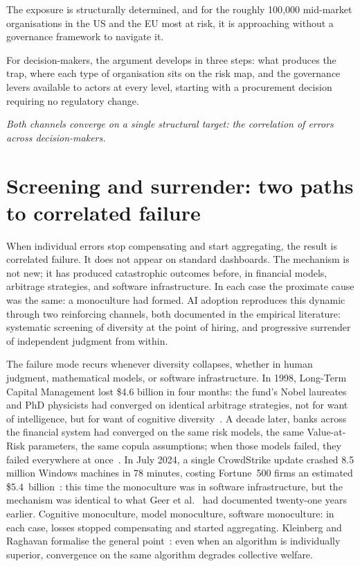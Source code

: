 \documentclass[11pt,a4paper]{article}
\newcommand{\bridgeskip}{\vspace{6pt}}
\begin{document}
The exposure is structurally determined, and for the roughly 100{,}000 mid-market
organisations in the US and the EU most at risk, it is approaching without
a governance framework to navigate it.

For decision-makers, the argument develops in three steps: what produces the trap,
where each type of organisation sits on the risk map, and the governance levers
available to actors at every level, starting with a procurement decision requiring
no regulatory change.

\bridgeskip
\noindent\emph{Both channels converge on a single structural target: the
correlation of errors across decision-makers.}

\section{Screening and surrender: two paths to correlated failure}

When individual errors stop compensating and start aggregating, the result is
correlated failure. It does not appear on standard dashboards. The mechanism is
not new; it has produced catastrophic outcomes before, in financial models,
arbitrage strategies, and software infrastructure. In each case the proximate
cause was the same: a monoculture had formed. AI adoption reproduces this dynamic
through two reinforcing channels, both documented in the empirical literature:
systematic screening of diversity at the point of hiring, and progressive
surrender of independent judgment from within.

The failure mode recurs whenever diversity collapses,
whether in human judgment, mathematical models, or software
infrastructure. In 1998, Long-Term Capital Management lost \$4.6 billion
in four months: the fund's Nobel laureates and PhD physicists had
converged on identical arbitrage strategies, not for want of
intelligence, but for want of cognitive
diversity~\cite{jorion_efm_2000,mackenzie_econsoc_2003}. A decade later,
banks across the financial system had converged on the same risk models,
the same Value-at-Risk parameters, the same copula assumptions; when
those models failed, they failed everywhere at
once~\cite{haldane_nature_2011}. In July 2024, a single CrowdStrike
update crashed 8.5 million Windows machines in 78 minutes, costing
Fortune~500 firms an estimated
\$5.4~billion~\cite{microsoft_crowdstrike_2024,parametrix_crowdstrike_2024}:
this time the monoculture was in software infrastructure, but the
mechanism was identical to what Geer et al.~\cite{geer_ccia_2003} had
documented twenty-one years earlier. Cognitive monoculture, model
monoculture, software monoculture: in each case, losses stopped
compensating and started aggregating. Kleinberg and Raghavan formalise
the general point~\cite{kleinberg_pnas_2021}: even when an algorithm is
individually superior, convergence on the same algorithm degrades
collective welfare.
\end{document}

